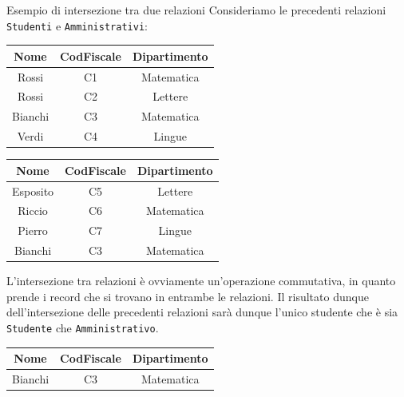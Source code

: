 \documentclass[12pt]{report}
\begin{document}
	\begin{esempio}{Esempio di intersezione tra due relazioni}{}
		Consideriamo le precedenti relazioni \texttt{Studenti} e \texttt{Amministrativi}:\\
		\begin{minipage}[t]{0.48\textwidth}
			\vspace{0.1em}
			\centering
			\renewcommand{\arraystretch}{1.3}
			\begin{tabular}{|c|c|c|}
				\hline
				\rowcolor{BrickRed!60!white}
				Nome & CodFiscale & Dipartimento \\
				\hline
				Rossi   & C1 & Matematica \\
				Rossi   & C2 & Lettere    \\
				Bianchi & C3 & Matematica \\
				Verdi   & C4 & Lingue     \\
				\hline
			\end{tabular}
		\end{minipage}\hfill
		\begin{minipage}[t]{0.48\textwidth}
			\vspace{0.1em}
			\centering
			\renewcommand{\arraystretch}{1.3}
			\begin{tabular}{|c|c|c|}
				\hline
				\rowcolor{BrickRed!60!white}
				Nome & CodFiscale & Dipartimento \\
				\hline
				Esposito & C5 & Lettere    \\
				Riccio   & C6 & Matematica \\
				Pierro   & C7 & Lingue     \\
				Bianchi  & C3 & Matematica \\
				\hline
			\end{tabular}
		\end{minipage}
		
		\vspace{1em}
		L'intersezione tra relazioni è ovviamente un'operazione commutativa, in quanto prende i record che si trovano in entrambe le relazioni. Il risultato dunque dell'intersezione delle precedenti relazioni sarà dunque l'unico studente che è sia \texttt{Studente} che \texttt{Amministrativo}.
		
		\begin{center}
			\renewcommand{\arraystretch}{1.3}
			\begin{tabular}{|c|c|c|}
				\hline
				\rowcolor{BrickRed!60!white}
				Nome & CodFiscale & Dipartimento \\
				\hline
				Bianchi & C3 & Matematica \\
				\hline
			\end{tabular}
		\end{center}
	\end{esempio}
	
\end{document}
